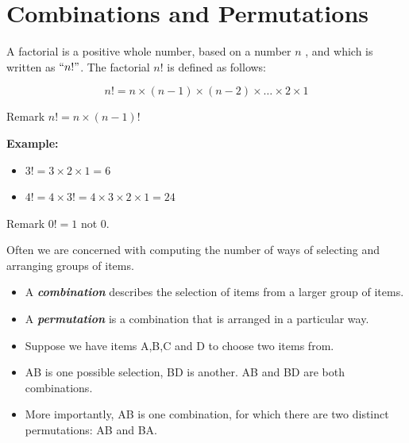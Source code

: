 \documentclass[12pt]{report}
\begin{document}
	
	
	\section{ Combinations and Permutations }
	
	{\Large
		
		A factorial is a positive whole number, based on a number $n$ , and which is written as $``n!"$. The factorial $n!$ is defined as follows:
		
		\[n!  =n \times (n-1) \times (n-2) \times \ldots \times 2 \times 1 \]
		
		Remark $n!  =n \times (n-1)!$\\ \bigskip
		
		\textbf{ Example: }
		
		\begin{itemize}
			\item $3!  = 3 \times 2  \times 1 = 6 $
			
			\item $4!  = 4 \times 3! = 4 \times 3 \times 2 \times 1 = 24$
		\end{itemize}
		Remark $0! = 1$ not $0$.
		
		
	}
	
	{\Large
		
		
		Often we are concerned with computing the number of ways of selecting and arranging groups of items. \begin{itemize} \item  A \textbf{\emph{combination}} describes the selection of items from a larger group of items.  \item A \textbf{\emph{permutation}} is a combination that is arranged in a particular way.
		\end{itemize}
		
		\bigskip
		\begin{itemize}
			\item Suppose we have items A,B,C and D to choose two items from.
			\item AB is one possible selection, BD is another. AB and BD are both combinations.
			\item More importantly, AB is one combination, for which there are two distinct permutations: AB and BA.
		\end{itemize}
	}
	
\end{document}
